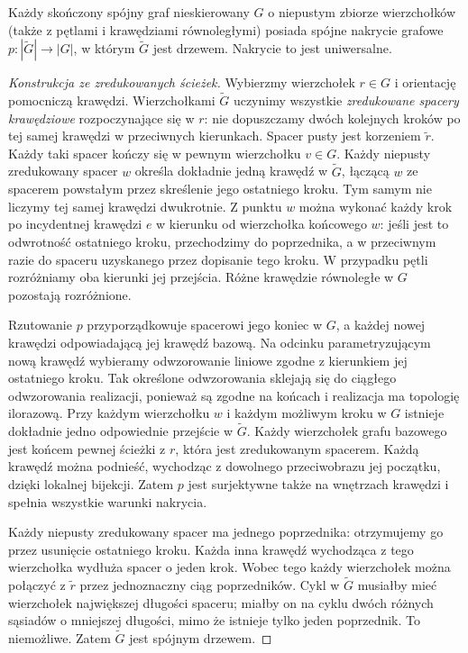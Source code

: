 \begin{twierdzenie}
\label{thm:tg-universal}
Każdy skończony spójny graf nieskierowany $G$
o niepustym zbiorze wierzchołków (także z pętlami
i krawędziami równoległymi) posiada spójne nakrycie grafowe
$p:|\widetilde G|\to|G|$, w którym $\widetilde G$ jest drzewem.
Nakrycie to jest uniwersalne.
\end{twierdzenie}

\begin{proof}[Konstrukcja ze zredukowanych ścieżek]
Wybierzmy wierzchołek $r\in G$ i orientację pomocniczą
krawędzi. Wierzchołkami $\widetilde G$ uczynimy wszystkie
\emph{zredukowane spacery krawędziowe} rozpoczynające się w $r$:
nie dopuszczamy dwóch kolejnych kroków po tej samej krawędzi
w przeciwnych kierunkach. Spacer pusty jest korzeniem $\widetilde r$.
Każdy taki spacer kończy się w pewnym wierzchołku $v\in G$.
Każdy niepusty zredukowany spacer $w$ określa dokładnie
jedną krawędź w $\widetilde G$, łączącą $w$ ze spacerem
powstałym przez skreślenie jego ostatniego kroku.
Tym samym nie liczymy tej samej krawędzi dwukrotnie.
Z punktu $w$ można wykonać każdy krok po incydentnej
krawędzi $e$ w kierunku od wierzchołka końcowego $w$:
jeśli jest to odwrotność ostatniego kroku,
przechodzimy do poprzednika, a w przeciwnym razie
do spaceru uzyskanego przez dopisanie tego kroku.
W przypadku pętli rozróżniamy oba kierunki jej przejścia.
Różne krawędzie równoległe w $G$ pozostają rozróżnione.

Rzutowanie $p$ przyporządkowuje spacerowi jego koniec w $G$,
a każdej nowej krawędzi odpowiadającą jej krawędź bazową.
Na odcinku parametryzującym nową krawędź wybieramy
odwzorowanie liniowe zgodne z kierunkiem jej ostatniego
kroku. Tak określone odwzorowania sklejają się do
ciągłego odwzorowania realizacji, ponieważ są zgodne
na końcach i realizacja ma topologię ilorazową.
Przy każdym wierzchołku $w$ i każdym możliwym kroku w $G$
istnieje dokładnie jedno odpowiednie przejście w $\widetilde G$.
Każdy wierzchołek grafu bazowego jest końcem pewnej
ścieżki z $r$, która jest zredukowanym spacerem.
Każdą krawędź można podnieść, wychodząc z dowolnego
przeciwobrazu jej początku, dzięki lokalnej bijekcji.
Zatem $p$ jest surjektywne także na wnętrzach krawędzi
i spełnia wszystkie warunki nakrycia.

Każdy niepusty zredukowany spacer ma jednego poprzednika:
otrzymujemy go przez usunięcie ostatniego kroku.
Każda inna krawędź wychodząca z tego wierzchołka wydłuża
spacer o jeden krok. Wobec tego każdy wierzchołek można
połączyć z $\widetilde r$ przez jednoznaczny ciąg poprzedników.
Cykl w $\widetilde G$ musiałby mieć wierzchołek największej
długości spaceru; miałby on na cyklu dwóch różnych sąsiadów
o mniejszej długości, mimo że istnieje tylko jeden poprzednik.
To niemożliwe. Zatem $\widetilde G$ jest spójnym drzewem.


\end{proof}
